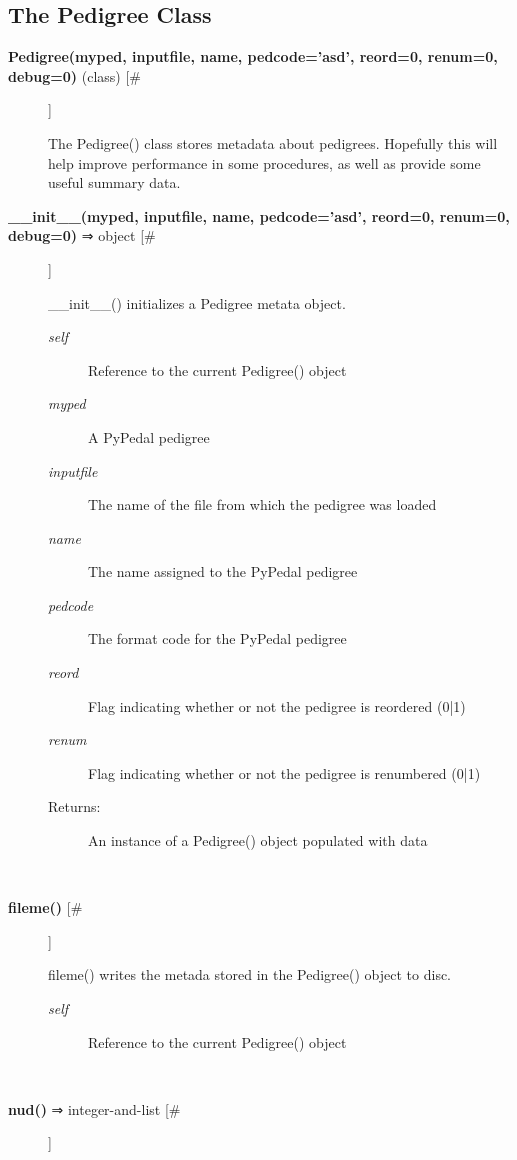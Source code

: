 \subsection*{The Pedigree Class}
\begin{description}
\item[\textbf{Pedigree(myped, inputfile, name, pedcode='asd', reord=0, renum=0, debug=0)}
 (class) [\#]]

 The Pedigree() class stores metadata about pedigrees. Hopefully this will help improve performance in some procedures, as well as provide some useful summary data.

\item[\textbf{\_\_init\_\_(myped, inputfile, name, pedcode='asd', reord=0, renum=0, debug=0)}
 ⇒ object [\#]]

 \_\_init\_\_() initializes a Pedigree metata object.
\begin{description}
\item[\emph{self}
] Reference to the current Pedigree() object
\item[\emph{myped}
] A PyPedal pedigree
\item[\emph{inputfile}
] The name of the file from which the pedigree was loaded
\item[\emph{name}
] The name assigned to the PyPedal pedigree
\item[\emph{pedcode}
] The format code for the PyPedal pedigree
\item[\emph{reord}
] Flag indicating whether or not the pedigree is reordered (0|1)
\item[\emph{renum}
] Flag indicating whether or not the pedigree is renumbered (0|1)
\item[Returns:] An instance of a Pedigree() object populated with data

\end{description}
\\ 

\item[\textbf{fileme()}
 [\#]]

 fileme() writes the metada stored in the Pedigree() object to disc.
\begin{description}
\item[\emph{self}
] Reference to the current Pedigree() object

\end{description}
\\ 

\item[\textbf{nud()}
 ⇒ integer-and-list [\#]]


\end{description}
